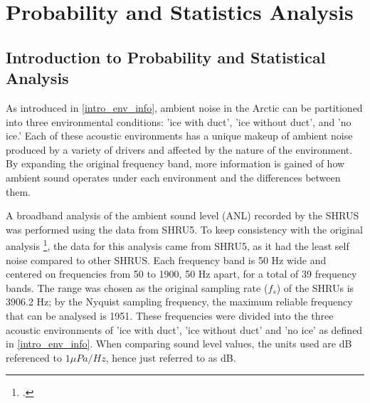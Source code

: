 
\chapter{Probability and Statistics Analysis} \label{sec_probsnstat}


\section{Introduction to Probability and Statistical Analysis} \label{sec_statintro}


As introduced in \autoref{intro_env_info}, ambient noise in the Arctic can be partitioned into three environmental conditions: 'ice with duct', 'ice without duct', and 'no ice.' Each of these acoustic environments has a unique makeup of ambient noise produced by a variety of drivers and affected by the nature of the environment. By expanding the original frequency band, more information is gained of how ambient sound operates under each environment and the differences between them.  

 A broadband analysis of the ambient sound level (ANL) recorded by the SHRUS was performed using the data from SHRU5. To keep consistency with the original analysis \footcite[]{Bonnel2021}, the data for this analysis came from SHRU5, as it had the least self noise compared to other SHRUS. Each frequency band is 50 Hz wide and centered on frequencies from 50 to 1900, 50 Hz apart, for a total of 39 frequency bands. The range was chosen as the original sampling rate ($f_{s}$) of the SHRUs is  3906.2 Hz; by the Nyquist sampling frequency, the maximum reliable frequency that can be analysed is 1951.  These frequencies were divided into the three acoustic environments of 'ice with duct', 'ice without duct' and 'no ice' as defined in \autoref{intro_env_info}. When comparing sound level values, the units used are dB referenced to $1 \mu Pa/Hz $, hence just referred to as dB. %

